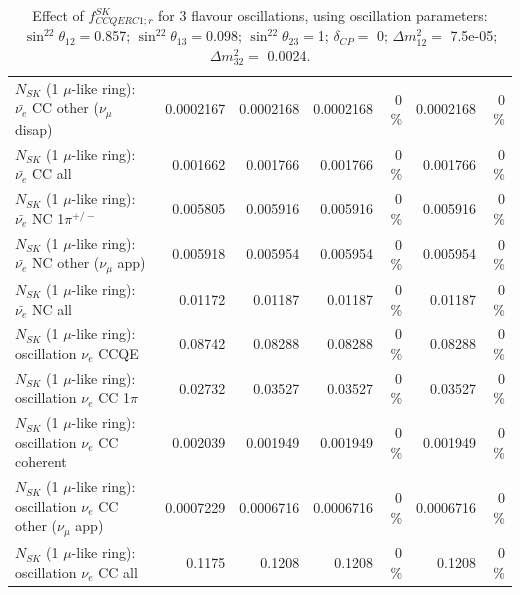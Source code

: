 \begin{table}
\begin{tabular}{| l | r | r | r  r | r  r |}
          $N_{SK}$ (1 $\mu$-like ring): $\bar{\nu_e}$ CC other ($\nu_\mu$ disap) &       0.0002167 &       0.0002168 &       0.0002168 &        0 \%  &       0.0002168 &        0 \%  \\ 
                            $N_{SK}$ (1 $\mu$-like ring): $\bar{\nu_{e}}$ CC all &        0.001662 &        0.001766 &        0.001766 &        0 \%  &        0.001766 &        0 \%  \\ 
\hline
                     $N_{SK}$ (1 $\mu$-like ring): $\bar{\nu_e}$ NC 1$\pi^{+/-}$ &        0.005805 &        0.005916 &        0.005916 &        0 \%  &        0.005916 &        0 \%  \\ 
            $N_{SK}$ (1 $\mu$-like ring): $\bar{\nu_e}$ NC other ($\nu_\mu$ app) &        0.005918 &        0.005954 &        0.005954 &        0 \%  &        0.005954 &        0 \%  \\ 
                            $N_{SK}$ (1 $\mu$-like ring): $\bar{\nu_{e}}$ NC all &         0.01172 &         0.01187 &         0.01187 &        0 \%  &         0.01187 &        0 \%  \\ 
\hline
\hline
\hline
                          $N_{SK}$ (1 $\mu$-like ring): oscillation $\nu_e$ CCQE &         0.08742 &         0.08288 &         0.08288 &        0 \%  &         0.08288 &        0 \%  \\ 
                     $N_{SK}$ (1 $\mu$-like ring): oscillation $\nu_e$ CC 1$\pi$ &         0.02732 &         0.03527 &         0.03527 &        0 \%  &         0.03527 &        0 \%  \\ 
                   $N_{SK}$ (1 $\mu$-like ring): oscillation $\nu_e$ CC coherent &        0.002039 &        0.001949 &        0.001949 &        0 \%  &        0.001949 &        0 \%  \\ 
      $N_{SK}$ (1 $\mu$-like ring): oscillation $\nu_e$ CC other ($\nu_\mu$ app) &       0.0007229 &       0.0006716 &       0.0006716 &        0 \%  &       0.0006716 &        0 \%  \\ 
                       $N_{SK}$ (1 $\mu$-like ring): oscillation $\nu_e$  CC all &          0.1175 &          0.1208 &          0.1208 &        0 \%  &          0.1208 &        0 \%  \\ 
\hline
\hline
\end{tabular}
\caption{ Effect of $f_{CCQERC1; r}^{SK}$ for 3 flavour oscillations, using oscillation parameters:  $\sin^22\theta_{12} = $0.857; $\sin^22\theta_{13} = $0.098; $\sin^22\theta_{23} = $1; $\delta_{CP} = $        0; $\Delta m^2_{12} = $    7.5e-05; $\Delta m^2_{32} = $    0.0024. }
\label{tab:num_sk_1Rmu_ccqe_ring_counting_eff_1_1RmuT_3f_osc_t13:0.098_spectralreco_spectraltrue}
\end{table}
